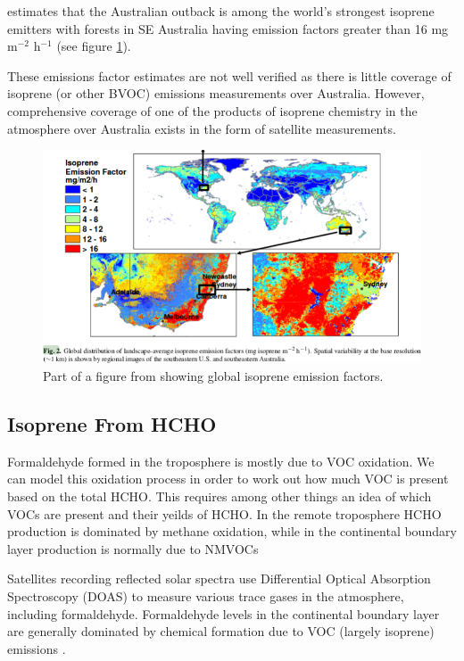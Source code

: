     \citet{Guenther2006} estimates that the Australian outback is among the world's strongest isoprene emitters with forests in SE Australia having emission factors greater than 16 mg m$^{-2}$ h$^{-1}$ (see figure \ref{ch1:fig:meganisoprene}).

    These emissions factor estimates are not well verified as there is little coverage of isoprene (or other BVOC) emissions measurements over Australia. However, comprehensive coverage of one of the products of isoprene chemistry in the atmosphere over Australia exists in the form of satellite measurements. 
    
    \begin{figure}
      \includegraphics{Figures/MeganIsoprene1.png}
      \caption{ Part of a figure from \citet{Guenther2006} showing global isoprene emission factors. }
      \label{ch1:fig:meganisoprene}
    \end{figure}
    
  \subsection{Isoprene From HCHO}

    Formaldehyde formed in the troposphere is mostly due to VOC oxidation. We can model this oxidation process in order to work out how much VOC is present based on the total HCHO. This requires among other things an idea of which VOCs are present and their yeilds of HCHO.
    In the remote troposphere HCHO production is dominated by methane oxidation, while in the continental boundary layer production is normally due to NMVOCs \citep{Abbot2003,Kefauver2014}

    Satellites recording reflected solar spectra use Differential Optical Absorption Spectroscopy (DOAS) to measure various trace gases in the atmosphere, including formaldehyde. Formaldehyde levels in the continental boundary layer are generally dominated by chemical formation due to VOC (largely isoprene) emissions \citep{Kefauver2014}.
    
